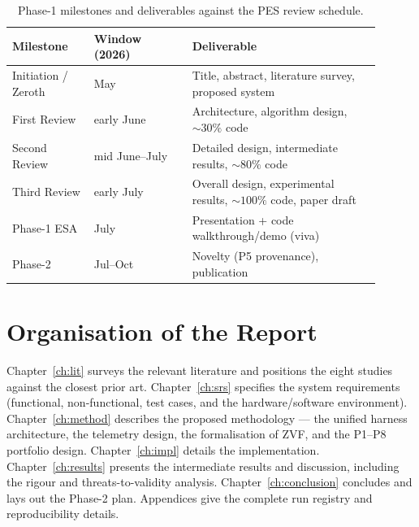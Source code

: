 \begin{table}[h]
\centering\small
\begin{tabular}{@{}L{0.20\linewidth}L{0.24\linewidth}L{0.46\linewidth}@{}}
\toprule
\textbf{Milestone} & \textbf{Window (2026)} & \textbf{Deliverable} \\
\midrule
Initiation / Zeroth & May & Title, abstract, literature survey, proposed system \\
First Review & early June & Architecture, algorithm design, ${\sim}30\%$ code \\
Second Review & mid June--July & Detailed design, intermediate results, ${\sim}80\%$ code \\
Third Review & early July & Overall design, experimental results, ${\sim}100\%$ code, paper draft \\
Phase-1 ESA & July & Presentation + code walkthrough/demo (viva) \\
Phase-2 & Jul--Oct & Novelty (P5 provenance), publication \\
\bottomrule
\end{tabular}
\caption{Phase-1 milestones and deliverables against the PES review schedule.}
\label{tab:timeline}
\end{table}

\section{Organisation of the Report}
Chapter~\ref{ch:lit} surveys the relevant literature and positions the eight
studies against the closest prior art. Chapter~\ref{ch:srs} specifies the system
requirements (functional, non-functional, test cases, and the hardware/software
environment). Chapter~\ref{ch:method} describes the proposed methodology --- the
unified harness architecture, the telemetry design, the formalisation of ZVF, and
the P1--P8 portfolio design. Chapter~\ref{ch:impl} details the implementation.
Chapter~\ref{ch:results} presents the intermediate results and discussion,
including the rigour and threats-to-validity analysis. Chapter~\ref{ch:conclusion}
concludes and lays out the Phase-2 plan. Appendices give the complete run registry
and reproducibility details.

